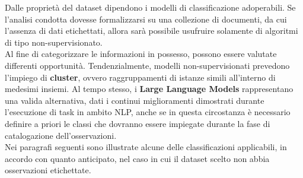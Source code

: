 Dalle proprietà del dataset dipendono i modelli di classificazione adoperabili. Se l'analisi condotta dovesse formalizzarsi su una collezione di documenti, da cui l'assenza di dati etichettati, allora sarà possibile usufruire solamente di algoritmi di tipo non-supervisionato. \vspace{7pt} \\
Al fine di categorizzare le informazioni in possesso, possono essere valutate differenti opportunità. Tendenzialmente, modelli non-supervisionati prevedono l'impiego di \textbf{cluster}, ovvero raggruppamenti di istanze simili all'interno di medesimi insiemi. Al tempo stesso, i \textbf{Large Language Models} rappresentano una valida alternativa, dati i continui miglioramenti dimostrati durante l'esecuzione di task in ambito NLP, anche se in questa circostanza è necessario definire a priori le classi che dovranno essere impiegate durante la fase di catalogazione dell'osservazioni. \vspace{7pt} \\
Nei paragrafi seguenti sono illustrate alcune delle classificazioni applicabili, in accordo con quanto anticipato, nel caso in cui il dataset scelto non abbia osservazioni etichettate.
